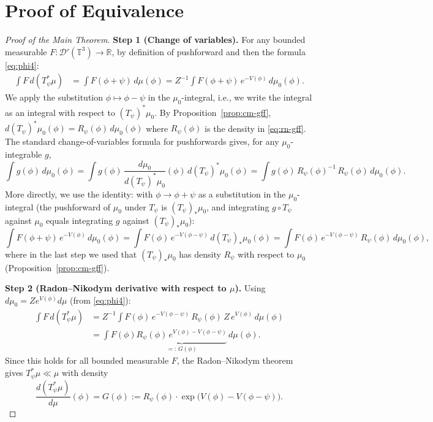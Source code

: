 \documentclass[12pt]{article}
\theoremstyle{definition}
\begin{document}
\section{Proof of Equivalence}

\begin{proof}[Proof of the Main Theorem]

\noindent\textbf{Step 1 (Change of variables).}
For any bounded measurable $F \colon \mathcal{D}'(\mathbb{T}^3) \to \mathbb{R}$, by definition of
pushforward and then the formula \eqref{eq:phi4}:
\begin{align*}
  \int F\, d(T_\psi^*\mu)
  &= \int F(\phi+\psi)\, d\mu(\phi)
   = Z^{-1}\int F(\phi+\psi)\, e^{-V(\phi)}\, d\mu_0(\phi).
\end{align*}
We apply the substitution $\phi \mapsto \phi - \psi$ in the $\mu_0$-integral, i.e., we
write the integral as an integral with respect to $(T_\psi)^*\mu_0$. By
Proposition~\ref{prop:cm-gff}, $d(T_\psi)^*\mu_0(\phi) = R_\psi(\phi)\,d\mu_0(\phi)$ where
$R_\psi(\phi)$ is the density in \eqref{eq:rn-gff}. The standard change-of-variables formula
for pushforwards gives, for any $\mu_0$-integrable $g$,
\[
  \int g(\phi)\, d\mu_0(\phi)
  = \int g(\phi)\, \frac{d\mu_0}{d(T_\psi)^*\mu_0}(\phi)\, d(T_\psi)^*\mu_0(\phi)
  = \int g(\phi)\, R_\psi(\phi)^{-1}\, R_\psi(\phi)\, d\mu_0(\phi).
\]
More directly, we use the identity: with $\phi \to \phi+\psi$ as a substitution in the
$\mu_0$-integral (the pushforward of $\mu_0$ under $T_\psi$ is $(T_\psi)_*\mu_0$, and
integrating $g \circ T_\psi$ against $\mu_0$ equals integrating $g$ against $(T_\psi)_*\mu_0$):
\[
  \int F(\phi+\psi)\, e^{-V(\phi)}\, d\mu_0(\phi)
  = \int F(\phi)\, e^{-V(\phi-\psi)}\, d(T_\psi)_*\mu_0(\phi)
  = \int F(\phi)\, e^{-V(\phi-\psi)}\, R_\psi(\phi)\, d\mu_0(\phi),
\]
where in the last step we used that $(T_\psi)_*\mu_0$ has density $R_\psi$ with respect to $\mu_0$
(Proposition~\ref{prop:cm-gff}).

\medskip
\noindent\textbf{Step 2 (Radon--Nikodym derivative with respect to $\mu$).}
Using $d\mu_0 = Z e^{V(\phi)} d\mu$ (from \eqref{eq:phi4}):
\begin{align*}
  \int F\, d(T_\psi^*\mu)
  &= Z^{-1}\int F(\phi)\, e^{-V(\phi-\psi)}\, R_\psi(\phi)\, Z\, e^{V(\phi)}\, d\mu(\phi)\\
  &= \int F(\phi)\underbrace{R_\psi(\phi)\, e^{V(\phi)-V(\phi-\psi)}}_{\displaystyle =:\, G(\phi)}\, d\mu(\phi).
\end{align*}
Since this holds for all bounded measurable $F$, the Radon--Nikodym theorem gives
$T_\psi^*\mu \ll \mu$ with density
\begin{equation}
\label{eq:G}
  \frac{d(T_\psi^*\mu)}{d\mu}(\phi) = G(\phi)
  := R_\psi(\phi)\cdot \exp\!\bigl(V(\phi)-V(\phi-\psi)\bigr).
\end{equation}


\end{proof}
\end{document}
